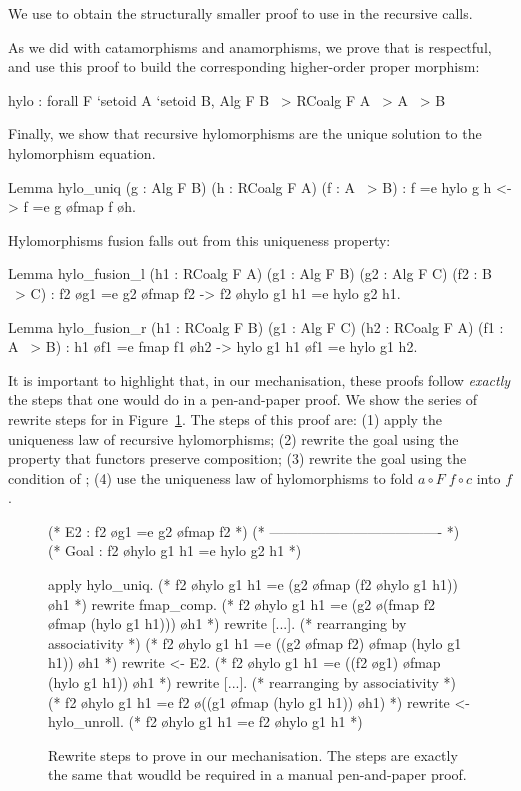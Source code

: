 \documentclass{llncs}
\begin{document}
\noindent
We use  to obtain the structurally smaller proof to use in
the recursive calls.

\noindent
As we did with catamorphisms and anamorphisms, we
prove that  is respectful, and use this proof to build the
corresponding higher-order proper morphism:
\begin{coqcode}
hylo : forall F `{setoid A} `{setoid B}, Alg F B ~> RCoalg F A ~> A ~> B
\end{coqcode}
Finally, we show that recursive hylomorphisms are the unique solution to the
hylomorphism equation.
\begin{coqcode}
Lemma hylo_uniq (g : Alg F B) (h : RCoalg F A) (f : A ~> B)
    : f =e hylo g h <-> f =e g \o fmap f \o h.
\end{coqcode}
Hylomorphisms fusion falls out from this uniqueness property:
\begin{coqcode}
Lemma hylo_fusion_l
  (h1 : RCoalg F A) (g1 : Alg F B) (g2 : Alg F C) (f2 : B ~> C)
  : f2 \o g1 =e g2 \o fmap f2 ->
    f2 \o hylo g1 h1 =e hylo g2 h1.

Lemma hylo_fusion_r
  (h1 : RCoalg F B) (g1 : Alg F C) (h2 : RCoalg F A) (f1 : A ~> B)
  :  h1 \o f1 =e fmap f1 \o h2 ->
     hylo g1 h1 \o f1 =e hylo g1 h2.
\end{coqcode}

\noindent
It is important to highlight that, in our mechanisation, these proofs follow
\emph{exactly} the steps that one would do in a pen-and-paper proof.  We show
the series of rewrite steps for  in
Figure~\ref{fig:proof-fusion-l}. The steps of this proof are: (1) apply the
uniqueness law of recursive hylomorphisms; (2) rewrite the goal using the
property that functors preserve composition; (3) rewrite the goal using the
condition of ; (4) use the uniqueness law of hylomorphisms to
fold $a \circ F \; f \circ c$ into $f$.
\begin{figure}
\begin{coqcode}
(* E2 : f2 \o g1 =e g2 \o fmap f2 *)
(* ------------------------------------- *)
(* Goal : f2 \o hylo g1 h1 =e hylo g2 h1 *)

apply hylo_uniq.
       (* f2 \o hylo g1 h1 =e (g2 \o fmap (f2 \o hylo g1 h1)) \o h1        *)
rewrite fmap_comp.
       (* f2 \o hylo g1 h1 =e (g2 \o (fmap f2 \o fmap (hylo g1 h1))) \o h1 *)
rewrite [...]. (* rearranging by associativity *)
       (* f2 \o hylo g1 h1 =e ((g2 \o fmap f2) \o fmap (hylo g1 h1)) \o h1 *)
rewrite <- E2.
       (* f2 \o hylo g1 h1 =e ((f2 \o g1) \o fmap (hylo g1 h1)) \o h1      *)
rewrite [...]. (* rearranging by associativity *)
       (* f2 \o hylo g1 h1 =e f2 \o ((g1 \o fmap (hylo g1 h1)) \o h1)      *)
rewrite <- hylo_unroll.
       (* f2 \o hylo g1 h1 =e f2 \o hylo g1 h1                             *)
\end{coqcode}
  \caption{Rewrite steps to prove  in our mechanisation. The
steps are exactly the same that woudld be required in a manual pen-and-paper
proof.}
\label{fig:proof-fusion-l}
\end{figure}
\end{document}
